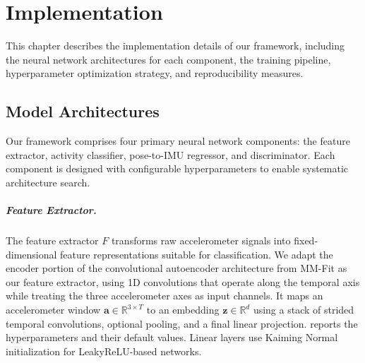 \chapter{Implementation}
\label{chap:implementation}
{\renewcommand{\thefootnote}{}}

This chapter describes the implementation details of our framework, including the neural network architectures for each component, the training pipeline, hyperparameter optimization strategy, and reproducibility measures.

\section{Model Architectures}
\label{sec:architectures}

Our framework comprises four primary neural network components: the feature extractor, activity classifier, pose-to-IMU regressor, and discriminator. Each component is designed with configurable hyperparameters to enable systematic architecture search.

\paragraph{Feature Extractor.}
The feature extractor $F$ transforms raw accelerometer signals into fixed-dimensional feature representations suitable for classification. We adapt the encoder portion of the convolutional autoencoder architecture from MM-Fit \cite{stromback2020mm} as our feature extractor, using 1D convolutions that operate along the temporal axis while treating the three accelerometer axes as input channels. It maps an accelerometer window $\mathbf{a}\in\mathbb{R}^{3\times T}$ to an embedding $\mathbf{z}\in\mathbb{R}^{d}$ using a stack of strided temporal convolutions, optional pooling, and a final linear projection.  reports the hyperparameters and their default values. Linear layers use Kaiming Normal initialization \cite{he2015delving} for LeakyReLU-based networks.

